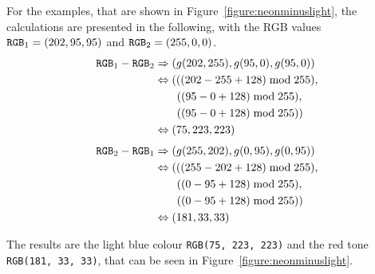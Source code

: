 \documentclass[../MasterThesis.tex]{subfiles}
\begin{document}
For the examples, that are shown in Figure~\ref{figure:neonminuslight}, the calculations are presented in the following, with the RGB values $\text{\texttt{RGB}}_1 = (202, 95, 95)$ and
$\text{\texttt{RGB}}_2 = (255, 0, 0)$.
%
\begin{align*}
	\text{\texttt{RGB}}_1 - \text{\texttt{RGB}}_2 & \Rightarrow (g(202, 255), g(95, 0), g(95, 0)) \\
	 & \Leftrightarrow (((202 - 255 + 128)\bmod 255), \\
	 & \ \ \ \ \ \ ((95 - 0 + 128) \bmod 255), \\
	 & \ \ \ \ \ \ ((95 - 0 + 128)\bmod 255)) \\
	 & \Leftrightarrow (75, 223, 223) 
\end{align*}
%
%
\begin{align*}
	\text{\texttt{RGB}}_2 - \text{\texttt{RGB}}_1 & \Rightarrow (g(255, 202), g(0, 95), g(0, 95)) \\
	 & \Leftrightarrow (((255 - 202 + 128)\bmod 255), \\
	 & \ \ \ \ \ \ ((0 - 95 + 128) \bmod 255), \\
	 & \ \ \ \ \ \ ((0 - 95 + 128) \bmod 255)) \\
	 & \Leftrightarrow (181, 33, 33) 
\end{align*}

The results are the light blue colour \texttt{RGB(75, 223, 223)} and the red tone \texttt{RGB(181, 33, 33)}, that can be seen in Figure~\ref{figure:neonminuslight}. 




















	
	
	
	
\end{document}
